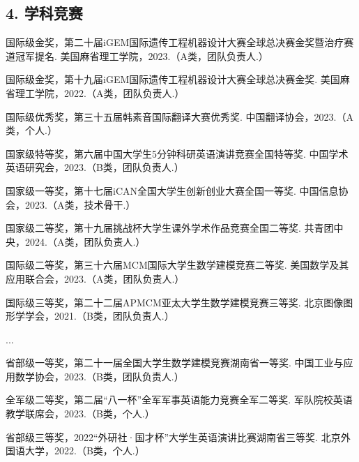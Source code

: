 \begin{resume}
    \section*{4. 学科竞赛} %
  \begin{enumerate}[label={[\arabic*]},itemsep=0pt,parsep=0pt,labelindent=26pt,labelwidth=*,leftmargin=0pt,itemindent=*,align=left]
  \item 国际级金奖，第二十届iGEM国际遗传工程机器设计大赛全球总决赛金奖暨治疗赛道冠军提名. 美国麻省理工学院，2023.（A类，团队负责人.）
  \item 国际级金奖，第十九届iGEM国际遗传工程机器设计大赛全球总决赛金奖. 美国麻省理工学院，2022.（A类，团队负责人.）
  \item 国际级优秀奖，第三十五届韩素音国际翻译大赛优秀奖. 中国翻译协会，2023.（A类，个人.）
  \item 国家级特等奖，第六届中国大学生5分钟科研英语演讲竞赛全国特等奖. 中国学术英语研究会，2023.（B类，团队负责人.）
  \item 国家级一等奖，第十七届iCAN全国大学生创新创业大赛全国一等奖. 中国信息协会，2023.（A类，技术骨干.）
  \item 国家级二等奖，第十九届挑战杯大学生课外学术作品竞赛全国二等奖. 共青团中央，2024.（A类，团队负责人.）
  \item 国际级二等奖，第三十六届MCM国际大学生数学建模竞赛二等奖. 美国数学及其应用联合会，2023.（A类，团队负责人.）
  \item 国际级三等奖，第二十二届APMCM亚太大学生数学建模竞赛三等奖. 北京图像图形学学会，2021.（B类，团队负责人.）
  \item ...
  \item 省部级一等奖，第二十一届全国大学生数学建模竞赛湖南省一等奖. 中国工业与应用数学协会，2023.（B类，团队负责人.）
  \item 全军级二等奖，第二届“八一杯”全军军事英语能力竞赛全军二等奖. 军队院校英语教学联席会，2023.（B类，个人.）
  \item 省部级三等奖，2022“外研社·国才杯”大学生英语演讲比赛湖南省三等奖. 北京外国语大学，2022.（B类，个人.）
  \end{enumerate}
\end{resume}
